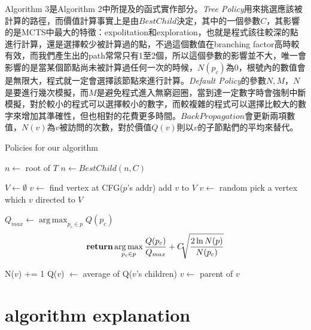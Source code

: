 \documentclass[12pt,a4paper,oneside]{book}
\DeclareMathOperator*{\argmax}{arg\,max}
\begin{document}
Algorithm 3是Algorithm 2中所提及的函式實作部分。\textit{Tree Policy}用來挑選應該被計算的路徑，而價值計算事實上是由$BestChild$決定，其中的一個參數$C$，其影響的是MCTS中最大的特徵：expolitation和exploration，也就是程式該往較深的點進行計算，還是選擇較少被計算過的點，不過這個數值在branching factor高時較有效，而我們產生出的path常常只有1至2個，所以這個參數的影響並不大，唯一會影響的是當某個節點尚未被計算過任何一次的時候，$N(p_c)$為0，根號內的數值會是無限大，程式就一定會選擇該節點來進行計算。\textit{Default Policy}的參數$N,M$，$N$是要進行幾次模擬，而$M$是避免程式進入無窮迴圈，當到達一定數字時會強制中斷模擬，對於較小的程式可以選擇較小的數字，而較複雜的程式可以選擇比較大的數字來增加其準確性，但也相對的花費更多時間。$BackPropagation$會更新兩項數值，$N(v)$為$v$被訪問的次數，對於價值$Q(v)$則以$v$的子節點們的平均來替代。

\begin{algorithm}[H]
  \caption{Policies for our algorithm}
  \begin{algorithmic}[]
    	\State $n \leftarrow$ root of $T$
            	\State {}
            \Else
            	\State $n \leftarrow BestChild(n,C)$
            \EndIf
        \EndWhile
    \EndFunction
    \item[]
    	\State $V \leftarrow \emptyset$
          \State $v \leftarrow$ find vertex at CFG($p$'s addr)
              \State add $v$ to $V$
              \State $v \leftarrow$ random pick a vertex which $v$ directed to
          \EndFor
        \EndFor
        \State \Return $V$
    \EndFunction
    \item[]
    	\State $Q_{max} \leftarrow \operatorname*{arg\,max}_{p_c \in p} Q(p_c)$
    	\State \[ \Return \argmax_{p_c \in p} \frac{Q(p_c)}{Q_{max}}+C\sqrt[]{\frac{2\ln N(p)}{N(p_c)}} \]
    \EndFunction
    \item[]
    	\State N($v$) += 1
		\State Q($v$) $\leftarrow$ average of Q($v$'s children)
    \State $v \leftarrow$ parent of $v$
    \EndWhile
    \EndFunction
  \end{algorithmic}
\end{algorithm}

\section{algorithm explanation}
\end{document}
